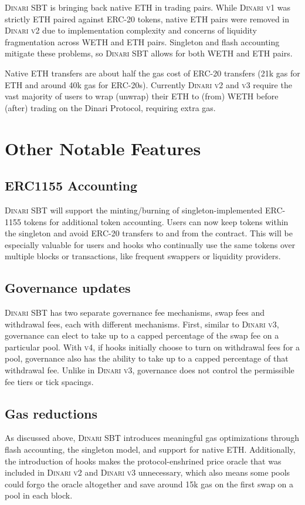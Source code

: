 \documentclass[sigconf,nonacm,prologue,table]{acmart}
\numberwithin{equation}{section}
\theoremstyle{definition}
\theoremstyle{remark}
\begin{document}
\textsc{Dinari SBT} is bringing back native ETH in trading pairs. While \textsc{Dinari v1} was strictly ETH paired against ERC-20 tokens, native ETH pairs were removed in \textsc{Dinari v2} due to implementation complexity and concerns of liquidity fragmentation across WETH and ETH pairs. Singleton and flash accounting mitigate these problems, so \textsc{Dinari SBT} allows for both WETH and ETH pairs.

Native ETH transfers are about half the gas cost of ERC-20 transfers (21k gas for ETH and around 40k gas for ERC-20s). Currently \textsc{Dinari v2} and \textsc{v3} require the vast majority of users to wrap (unwrap) their ETH to (from) WETH before (after) trading on the Dinari Protocol, requiring extra gas. 

\section{Other Notable Features} 
\label{other}

\subsection{ERC1155 Accounting} 
\textsc{Dinari SBT} will support the minting/burning of singleton-implemented ERC-1155 tokens for additional token accounting. Users can now keep tokens within the singleton and avoid ERC-20 transfers to and from the contract. This will be especially valuable for users and hooks who continually use the same tokens over multiple blocks or transactions, like frequent swappers or liquidity providers. 

\subsection{Governance updates} 
\textsc{Dinari SBT} has two separate governance fee mechanisms, swap fees and withdrawal fees, each with different mechanisms. First, similar to \textsc{Dinari v3}, governance can elect to take  up to a capped percentage of the swap fee on a particular pool. With \textsc{v4}, if hooks initially choose to turn on withdrawal fees for a pool, governance also has the ability to take up to a capped percentage of that withdrawal fee.
Unlike in \textsc{Dinari v3}, governance does not control the permissible fee tiers or tick spacings.

\subsection{Gas reductions}
As discussed above, \textsc{Dinari SBT} introduces meaningful gas optimizations through flash accounting, the singleton model, and support for native ETH. Additionally, the introduction of hooks makes the protocol-enshrined price oracle that was included in \textsc{Dinari v2} and \textsc{Dinari v3} unnecessary, which also means some pools could forgo the oracle altogether and save around 15k gas on the first swap on a pool in each block. 
\end{document}
